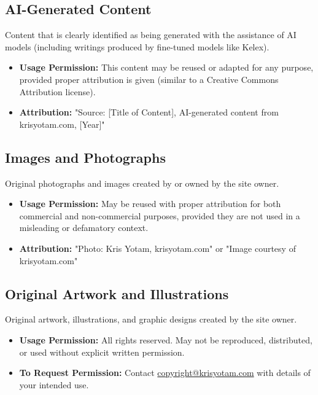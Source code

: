 \documentclass[11pt]{article}
\begin{document}
\subsection{AI-Generated Content}
Content that is clearly identified as being generated with the assistance of AI models (including writings produced by fine-tuned models like Kelex).
\begin{itemize}
  \item \textbf{Usage Permission:} This content may be reused or adapted for any purpose, provided proper attribution is given (similar to a Creative Commons Attribution license).
  \item \textbf{Attribution:} "Source: [Title of Content], AI-generated content from krisyotam.com, [Year]"
\end{itemize}

\subsection{Images and Photographs}
Original photographs and images created by or owned by the site owner.
\begin{itemize}
  \item \textbf{Usage Permission:} May be reused with proper attribution for both commercial and non-commercial purposes, provided they are not used in a misleading or defamatory context.
  \item \textbf{Attribution:} "Photo: Kris Yotam, krisyotam.com" or "Image courtesy of krisyotam.com"
\end{itemize}

\subsection{Original Artwork and Illustrations}
Original artwork, illustrations, and graphic designs created by the site owner.
\begin{itemize}
  \item \textbf{Usage Permission:} All rights reserved. May not be reproduced, distributed, or used without explicit written permission.
  \item \textbf{To Request Permission:} Contact \href{mailto:copyright@krisyotam.com}{copyright@krisyotam.com} with details of your intended use.
\end{itemize}
\end{document}
